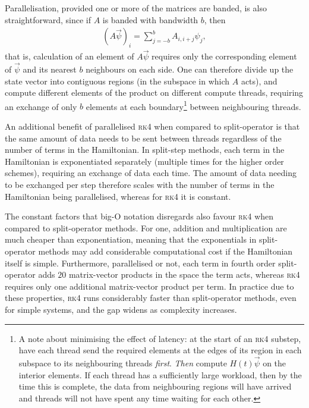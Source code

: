 Parallelisation, provided one or more of the matrices are banded, is also straightforward, since if $A$ is banded with bandwidth $b$, then
\begin{align}
(A \vec \psi)_i = \sum_{j=-b}^b A_{i, i+j} \psi_j,
\end{align}
that is, calculation of an element of $A\vec\psi$ requires only the corresponding element of $\vec \psi$ and its nearest $b$ neighbours on each side. One can therefore divide up the state vector into contiguous regions (in the subspace in which $A$ acts), and compute different elements of the product on different compute threads, requiring an exchange of only $b$ elements at each boundary\footnote{A note about minimising the effect of latency: at the start of an \textsc{rk4} substep, have each thread send the required elements at the edges of its region in each subspace to its neighbouring threads \emph{first}. \emph{Then} compute $H(t)\vec\psi$ on the interior elements. If each thread has a sufficiently large workload, then by the time this is complete, the data from neighbouring regions will have arrived and threads will not have spent any time waiting for each other.} between neighbouring threads.

An additional benefit of parallelised \textsc{rk4} when compared to split-operator is that the same amount of data needs to be sent between threads regardless of the number of terms in the Hamiltonian. In split-step methods, each term in the Hamiltonian is exponentiated separately (multiple times for the higher order schemes), requiring an exchange of data each time. The amount of data needing to be exchanged per step therefore scales with the number of terms in the Hamiltonian being parallelised, whereas for \textsc{rk4} it is constant.

The constant factors that big-O notation disregards also favour \textsc{rk4} when compared to split-operator methods. For one, addition and multiplication are much cheaper than exponentiation, meaning that the exponentials in split-operator methods may add considerable computational cost if the Hamiltonian itself is simple. Furthermore, parallelised or not, each term in fourth order split-operator adds $20$ matrix-vector products in the space the term acts, whereas \textsc{rk4} requires only one additional matrix-vector product per term. In practice due to these properties, \textsc{rk4} runs considerably faster than split-operator methods, even for simple systems, and the gap widens as complexity increases.


